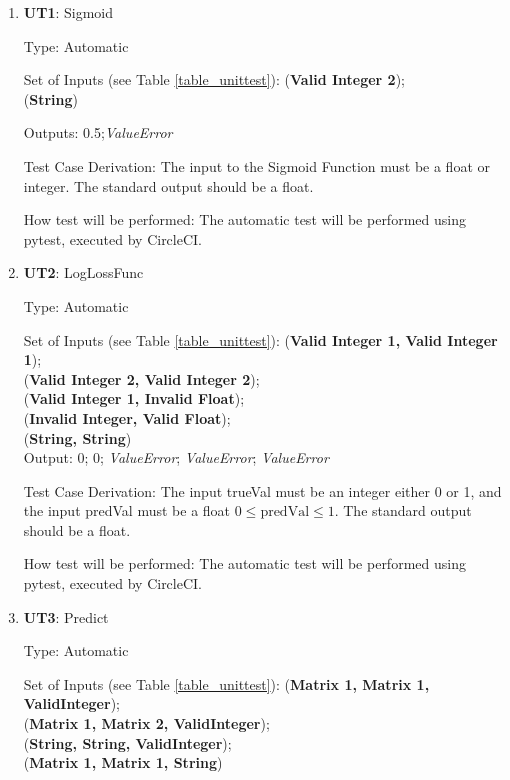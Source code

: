 \documentclass[12pt, titlepage]{article}
\begin{document}
\begin{enumerate}

\item{\textbf{UT1}: Sigmoid}

Type: Automatic
					
Set of Inputs (see Table \ref{table_unittest}): (\textbf{Valid Integer 2});\\
(\textbf{String})
					
Outputs: 0.5;\textit{ValueError}

Test Case Derivation: The input to the Sigmoid Function must be a float or integer. The standard output should be a float.

How test will be performed: The automatic test will be performed using pytest, executed by CircleCI.


\item{\textbf{UT2}: LogLossFunc}

Type: Automatic
					
Set of Inputs (see Table \ref{table_unittest}): (\textbf{Valid Integer 1, Valid Integer 1});\\
(\textbf{Valid Integer 2, Valid Integer 2});\\
(\textbf{Valid Integer 1, Invalid Float});\\
(\textbf{Invalid Integer, Valid Float});\\
(\textbf{String, String})\\
					
Output: 0; 0; \textit{ValueError}; \textit{ValueError}; \textit{ValueError}

Test Case Derivation: The input trueVal must be an integer either 0 or 1, and the input predVal must be a float $0 \leq \text{predVal} \leq 1$. The standard output should be a float.

How test will be performed: The automatic test will be performed using pytest, executed by CircleCI.

\item{\textbf{UT3}: Predict}

Type: Automatic
					
Set of Inputs (see Table \ref{table_unittest}): (\textbf{Matrix 1, Matrix 1, ValidInteger});\\
(\textbf{Matrix 1, Matrix 2, ValidInteger});\\
(\textbf{String, String, ValidInteger});\\
(\textbf{Matrix 1, Matrix 1, String})\\
					

\end{enumerate}
\end{document}
